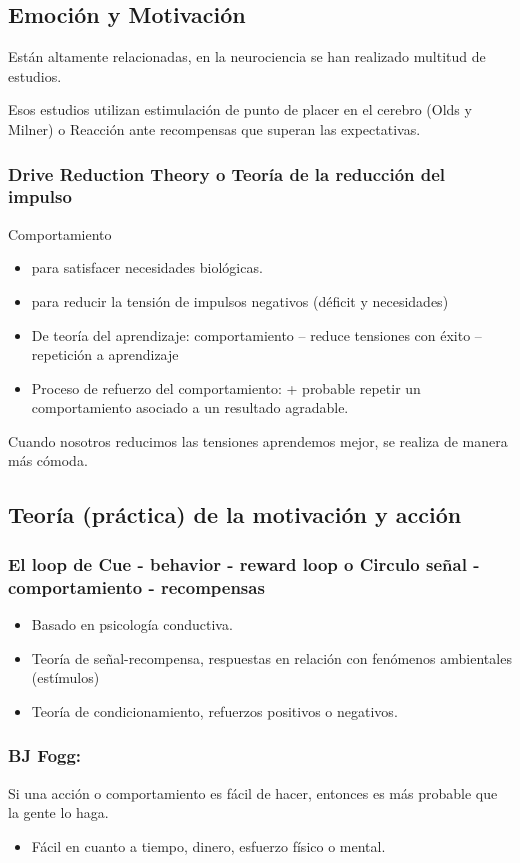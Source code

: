 \documentclass[12pt, twoside, openright]{report} %
\begin{document}
\subsection{Emoción y Motivación}
Están altamente relacionadas, en la neurociencia se han realizado multitud de estudios.

Esos estudios utilizan estimulación de punto de placer en el cerebro (Olds y Milner) o Reacción ante recompensas que superan las expectativas.
\pagebreak
\subsubsection{Drive Reduction Theory o Teoría de la reducción del impulso}
Comportamiento
\begin{itemize}
  \item para satisfacer necesidades biológicas.
  \item para reducir la tensión de impulsos negativos (déficit y necesidades)
  \item De teoría del aprendizaje: comportamiento – reduce tensiones con éxito – repetición a aprendizaje
  \item Proceso de refuerzo del comportamiento: + probable repetir un comportamiento asociado a un resultado agradable.
\end{itemize}
Cuando nosotros reducimos las tensiones aprendemos mejor, se realiza de manera más cómoda.

\subsection{Teoría (práctica) de la motivación y acción}
\subsubsection{El loop de Cue - behavior - reward loop o Circulo señal - comportamiento - recompensas}
\begin{itemize}
  \item Basado en psicología conductiva.
  \item Teoría de señal-recompensa, respuestas en relación con fenómenos ambientales (estímulos)
  \item Teoría de condicionamiento, refuerzos positivos o negativos.
\end{itemize} 

\subsubsection{BJ Fogg:}
Si una acción o comportamiento es fácil de hacer, entonces es más probable que la gente lo haga.
\begin{itemize}
  \item Fácil en cuanto a tiempo, dinero, esfuerzo físico o mental.
\end{itemize}
\end{document}
